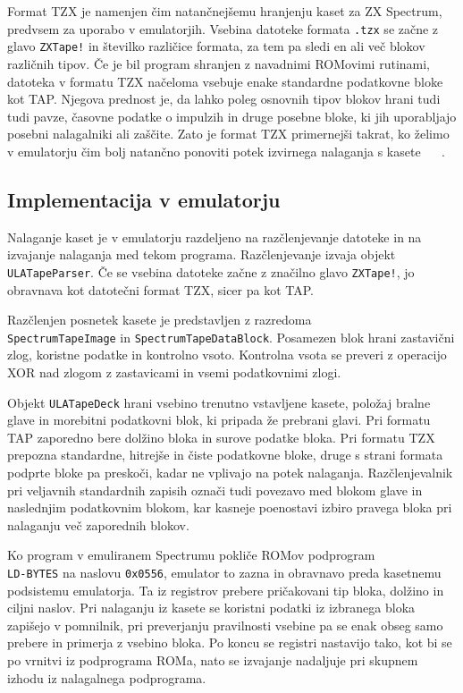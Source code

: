 \documentclass[a4paper, 12pt, openright]{book}
\begin{document}
    Format TZX je namenjen čim natančnejšemu hranjenju kaset za ZX Spectrum, predvsem
    za uporabo v emulatorjih. Vsebina datoteke formata \texttt{.tzx} se začne z glavo
    \texttt{ZXTape!} in številko različice formata, za tem pa sledi en ali več blokov
    različnih tipov. Če je bil program shranjen z navadnimi ROMovimi rutinami, datoteka
    v formatu TZX načeloma vsebuje enake standardne podatkovne bloke kot TAP.
    Njegova prednost je, da lahko poleg osnovnih tipov blokov hrani tudi tudi pavze,
    časovne podatke o impulzih in druge posebne bloke, ki jih uporabljajo posebni
    nalagalniki ali zaščite. Zato je format TZX primernejši takrat, ko želimo v emulatorju
    čim bolj natančno ponoviti potek izvirnega nalaganja s kasete ~\cite{tzxformat}
    ~\cite{worldofspectrumformats}.

    \subsection{Implementacija v emulatorju}

    Nalaganje kaset je v emulatorju razdeljeno na razčlenjevanje datoteke in na
    izvajanje nalaganja med tekom programa. Razčlenjevanje izvaja objekt \texttt{ULATapeParser}.
    Če se vsebina datoteke začne z značilno glavo \texttt{ZXTape!}, jo obravnava kot
    datotečni format TZX, sicer pa kot TAP.

    Razčlenjen posnetek kasete je predstavljen z razredoma\\ \texttt{SpectrumTapeImage}
    in \texttt{SpectrumTapeDataBlock}. Posamezen blok hrani zastavični zlog, koristne
    podatke in kontrolno vsoto. Kontrolna vsota se preveri z operacijo XOR nad
    zlogom z zastavicami in vsemi podatkovnimi zlogi.

    Objekt \texttt{ULATapeDeck} hrani vsebino trenutno vstavljene kasete,
    položaj bralne glave in morebitni podatkovni blok, ki pripada že prebrani glavi.
    Pri formatu TAP zaporedno bere dolžino bloka in surove podatke bloka. Pri formatu
    TZX prepozna standardne, hitrejše in čiste podatkovne bloke, druge s strani formata
    podprte bloke pa preskoči, kadar ne vplivajo na potek nalaganja. Razčlenjevalnik
    pri veljavnih standardnih zapisih označi tudi povezavo med blokom glave in naslednjim
    podatkovnim blokom, kar kasneje poenostavi izbiro pravega bloka pri
    nalaganju več zaporednih blokov.

    Ko program v emuliranem Spectrumu pokliče ROMov podprogram\\ \texttt{LD-BYTES}
    na naslovu \texttt{0x0556}, emulator to zazna in obravnavo preda kasetnemu
    podsistemu emulatorja. Ta iz registrov prebere pričakovani tip bloka,
    dolžino in ciljni naslov. Pri nalaganju iz kasete se koristni podatki iz izbranega
    bloka zapišejo v pomnilnik, pri preverjanju pravilnosti vsebine pa se enak
    obseg samo prebere in primerja z vsebino bloka. Po koncu se registri nastavijo
    tako, kot bi se po vrnitvi iz podprograma ROMa, nato se izvajanje nadaljuje pri
    skupnem izhodu iz nalagalnega podprograma.
\end{document}
